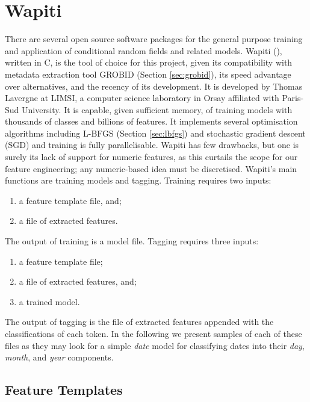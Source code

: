 \section{Wapiti}
\label{sec:wapiti}

There are several open source software packages for the general purpose training and application of conditional random fields and related models. Wapiti (\cite{lavergne2010practical}), written in C, is the tool of choice for this project, given its compatibility with metadata extraction tool GROBID (Section \ref{sec:grobid}), its speed advantage over alternatives, and the recency of its development. It is developed by Thomas Lavergne at LIMSI, a computer science laboratory in Orsay affiliated with Paris-Sud University. It is capable, given sufficient memory, of training models with thousands of classes and billions of features. It implements several optimisation algorithms including L-BFGS (Section \ref{sec:lbfgs}) and stochastic gradient descent (SGD) and training is fully parallelisable. Wapiti has few drawbacks, but one is surely its lack of support for numeric features, as this curtails the scope for our feature engineering; any numeric-based idea must be discretised. Wapiti's main functions are training models and tagging. Training requires two inputs:

\begin{enumerate}
\item a feature template file, and;
\item a file of extracted features.
\end{enumerate}

The output of training is a model file. Tagging requires three inputs:

\begin{enumerate}
\item a feature template file;
\item a file of extracted features, and;
\item a trained model.
\end{enumerate}

The output of tagging is the file of extracted features appended with the classifications of each token. In the following we present samples of each of these files as they may look for a simple \emph{date} model for classifying dates into their \emph{day}, \emph{month}, and \emph{year} components.

\subsection{Feature Templates}
\label{subsec:featuretemplates}

